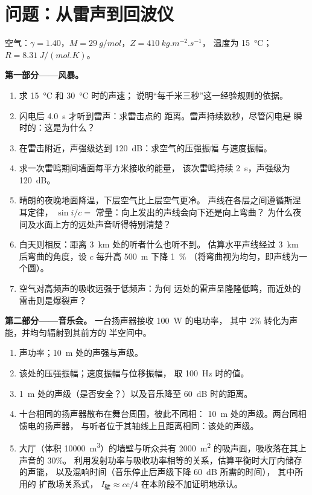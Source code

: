 \section{问题：从雷声到回波仪}

\begin{problem}
\label{pb:b2:sound-waves:1}

空气：$\gamma = 1.40$，$M = \qty{29}{g/mol}$，$Z = \qty{410}{kg.m^{-2}.s^{-1}}$，
温度为 \qty{15}{\degreeCelsius}；$R = \qty{8.31}{J/(mol.K)}$。

\medskip
\noindent\textbf{第一部分——风暴。}
\begin{enumerate}
  \item 求 \qty{15}{\degreeCelsius} 和 \qty{30}{\degreeCelsius} 时的声速；
        说明“每千米三秒”这一经验规则的依据。
  \item 闪电后 \qty{4.0}{s} 才听到雷声：求雷击点的
        距离。雷声持续数秒，尽管闪电是
        瞬时的：这是为什么？
  \item 在雷击附近，声强级达到 \qty{120}{dB}：求空气的压强振幅
        与速度振幅。
  \item 求一次雷鸣期间墙面每平方米接收的能量，
        该次雷鸣持续 \qty{2}{s}，声强级为 \qty{120}{dB}。
  \item 晴朗的夜晚地面降温，下层空气比上层空气更冷。
        声线在各层之间遵循斯涅耳定律，
        $\sin i/c = $ 常量：向上发出的声线会向下还是向上弯曲？
        为什么夜间及水面上方的远处声音听得特别清楚？
  \item 白天则相反：距离 \qty{3}{km} 处的听者什么也听不到。
        估算水平声线经过
        \qty{3}{km} 后弯曲的角度，设 $c$ 每升高 \qty{500}{m} 下降 \qty{1}{\%}
        （将弯曲视为均匀，即声线为一个圆）。

  \item 空气对高频声的吸收远强于低频声：为何
        远处的雷声呈隆隆低鸣，而近处的雷击则是爆裂声？
\end{enumerate}

\medskip
\noindent\textbf{第二部分——音乐会。}
一台扬声器接收 \qty{100}{W} 的电功率，
其中 $2\%$ 转化为声能，并均匀辐射到其前方的
半空间中。
\begin{enumerate}[resume]
  \item 声功率；\qty{10}{m} 处的声强与声级。
  \item 该处的压强振幅；速度振幅与位移振幅，
        取 \qty{100}{Hz} 时的值。
  \item \qty{1}{m} 处的声级（是否安全？）以及音乐降至
        \qty{60}{dB} 时的距离。
  \item 十台相同的扬声器散布在舞台周围，彼此不同相：
        \qty{10}{m} 处的声级。两台同相馈电的扬声器，
        与听者位于其轴线上且距离相同：该处的声级。
  \item 大厅（体积 \qty{10000}{m^3}）的墙壁与听众共有 \qty{2000}{m^2} 的吸声面，吸收落在其上声音的 $30\%$。
        利用发射功率与吸收功率相等的关系，估算平衡时大厅内储存的声能，
        以及混响时间（音乐停止后声级下降 \qty{60}{dB} 所需的时间），
        其中所用的
        扩散场关系式，
        $I_{\text{壁}} \approx ce/4$ 在本阶段不加证明地承认。
\end{enumerate}


\end{problem}
